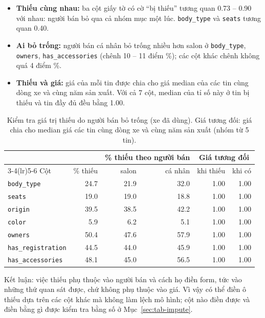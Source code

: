\begin{itemize}
  \item \textbf{Thiếu cùng nhau:} ba cột giấy tờ có cờ ``bị thiếu'' tương quan 0.73 -- 0.90 với nhau: người bán bỏ qua cả
        nhóm mục một lúc. \texttt{body\_type} và \texttt{seats} tương quan 0.40.
  \item \textbf{Ai bỏ trống:} người bán cá nhân bỏ trống nhiều hơn salon ở \texttt{body\_type}, \texttt{owners},
        \texttt{has\_accessories} (chênh 10 -- 11 điểm \%); các cột khác chênh không quá 4 điểm \%.
  \item \textbf{Thiếu và giá:} giá của mỗi tin được chia cho giá median của các tin cùng dòng xe và cùng năm sản xuất. Với
        cả 7 cột, median của tỉ số này ở tin bị thiếu và tin đầy đủ đều bằng 1.00.
\end{itemize}

\begin{table}[H]\centering
\caption{Kiểm tra giá trị thiếu do người bán bỏ trống (xe đã dùng). Giá tương đối: giá chia cho median giá các tin cùng
dòng xe và cùng năm sản xuất (nhóm từ 5 tin).}\label{tab:tab-mar}
\small
\begin{tabular}{lrrrrr}
\toprule
& & \multicolumn{2}{c}{\% thiếu theo người bán} & \multicolumn{2}{c}{Giá tương đối} \\
\cmidrule(lr){3-4}\cmidrule(lr){5-6}
Cột & \% thiếu & salon & cá nhân & khi thiếu & khi có \\
\midrule
\texttt{body\_type} & 24.7 & 21.9 & 32.0 & 1.00 & 1.00 \\
\texttt{seats} & 19.0 & 19.0 & 18.8 & 1.00 & 1.00 \\
\texttt{origin} & 39.5 & 38.5 & 42.2 & 1.00 & 1.00 \\
\texttt{color} & 5.9 & 6.2 & 5.1 & 1.00 & 1.00 \\
\texttt{owners} & 50.4 & 47.6 & 57.9 & 1.00 & 1.00 \\
\texttt{has\_registration} & 44.5 & 44.0 & 45.9 & 1.00 & 1.00 \\
\texttt{has\_accessories} & 48.1 & 45.0 & 56.5 & 1.00 & 1.00 \\
\bottomrule
\end{tabular}
\end{table}


Kết luận: việc thiếu phụ thuộc vào người bán và cách họ điền form, tức vào những thứ quan sát được, chứ không phụ thuộc
vào giá. Vì vậy có thể điền ô thiếu dựa trên các cột khác mà không làm lệch mô hình; cột nào điền được và điền bằng gì
được kiểm tra bằng số ở Mục~\ref{sec:tab-impute}.

